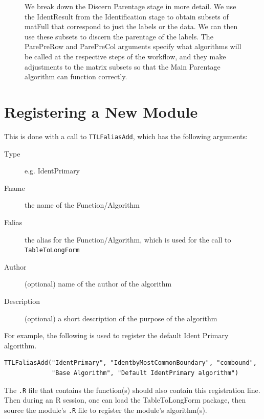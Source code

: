 \documentclass[a4paper]{article}
\begin{document}
\begin{figure}[!h]
\caption{We break down the Discern Parentage stage in more detail. We
  use the IdentResult from the Identification stage to obtain subsets
  of matFull that correspond to just the labels or the data. We can
  then use these subsets to discern the parentage of the labels. The
  ParePreRow and ParePreCol arguments specify what algorithms will be
  called at the respective steps of the workflow, and they make
  adjustments to the matrix subsets so that the Main Parentage
  algorithm can function correctly.}
\end{figure}

\clearpage
\section{Registering a New Module}
This is done with a call to \verb|TTLFaliasAdd|, which has the
following arguments:
\begin{description}
\item[Type] e.g. IdentPrimary
\item[Fname] the name of the Function/Algorithm
\item[Falias] the alias for the Function/Algorithm, which is used for
  the call to \verb|TableToLongForm|
\item[Author] (optional) name of the author of the algorithm
\item[Description] (optional) a short description of the purpose of
  the algorithm
\end{description}

For example, the following is used to register the default Ident
Primary algorithm.
\begin{verbatim}
TTLFaliasAdd("IdentPrimary", "IdentbyMostCommonBoundary", "combound",
             "Base Algorithm", "Default IdentPrimary algorithm")
\end{verbatim}

The \verb|.R| file that contains the function(s) should also contain
this registration line. Then during an R session, one can load the
TableToLongForm package, then source the module's \verb|.R| file to
register the module's algorithm(s).
\end{document}
